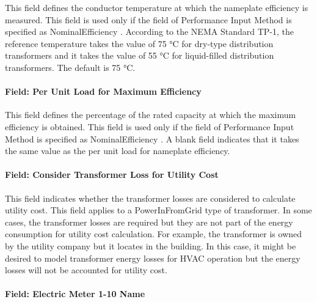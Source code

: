 This field defines the conductor temperature at which the nameplate efficiency is measured. This field is used only if the field of Performance Input Method is specified as NominalEfficiency . According to the NEMA Standard TP-1, the reference temperature takes the value of 75 °C for dry-type distribution transformers and it takes the value of 55 °C for liquid-filled distribution transformers. The default is 75 °C.

\paragraph{Field: Per Unit Load for Maximum Efficiency}\label{field-per-unit-load-for-maximum-efficiency}

This field defines the percentage of the rated capacity at which the maximum efficiency is obtained. This field is used only if the field of Performance Input Method is specified as NominalEfficiency . A blank field indicates that it takes the same value as the per unit load for nameplate efficiency.

\paragraph{Field: Consider Transformer Loss for Utility Cost}\label{field-consider-transformer-loss-for-utility-cost}

This field indicates whether the transformer losses are considered to calculate utility cost. This field applies to a PowerInFromGrid type of transformer. In some cases, the transformer losses are required but they are not part of the energy consumption for utility cost calculation. For example, the transformer is owned by the utility company but it locates in the building. In this case, it might be desired to model transformer energy losses for HVAC operation but the energy losses will not be accounted for utility cost.

\paragraph{Field: Electric Meter 1-10 Name}\label{field-electric-meter-1-10-name}

